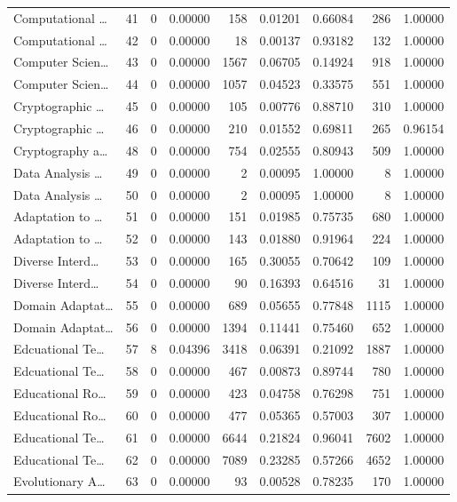 \begin{table}
\begin{tabular}{lrrrrrrrr}
Computational … & 41 & 0 & 0.00000 & 158 & 0.01201 & 0.66084 & 286 & 1.00000 \\
Computational … & 42 & 0 & 0.00000 & 18 & 0.00137 & 0.93182 & 132 & 1.00000 \\
Computer Scien… & 43 & 0 & 0.00000 & 1567 & 0.06705 & 0.14924 & 918 & 1.00000 \\
Computer Scien… & 44 & 0 & 0.00000 & 1057 & 0.04523 & 0.33575 & 551 & 1.00000 \\
Cryptographic … & 45 & 0 & 0.00000 & 105 & 0.00776 & 0.88710 & 310 & 1.00000 \\
Cryptographic … & 46 & 0 & 0.00000 & 210 & 0.01552 & 0.69811 & 265 & 0.96154 \\
Cryptography a… & 48 & 0 & 0.00000 & 754 & 0.02555 & 0.80943 & 509 & 1.00000 \\
Data Analysis … & 49 & 0 & 0.00000 & 2 & 0.00095 & 1.00000 & 8 & 1.00000 \\
Data Analysis … & 50 & 0 & 0.00000 & 2 & 0.00095 & 1.00000 & 8 & 1.00000 \\
Adaptation to … & 51 & 0 & 0.00000 & 151 & 0.01985 & 0.75735 & 680 & 1.00000 \\
Adaptation to … & 52 & 0 & 0.00000 & 143 & 0.01880 & 0.91964 & 224 & 1.00000 \\
Diverse Interd… & 53 & 0 & 0.00000 & 165 & 0.30055 & 0.70642 & 109 & 1.00000 \\
Diverse Interd… & 54 & 0 & 0.00000 & 90 & 0.16393 & 0.64516 & 31 & 1.00000 \\
Domain Adaptat… & 55 & 0 & 0.00000 & 689 & 0.05655 & 0.77848 & 1115 & 1.00000 \\
Domain Adaptat… & 56 & 0 & 0.00000 & 1394 & 0.11441 & 0.75460 & 652 & 1.00000 \\
Edcuational Te… & 57 & 8 & 0.04396 & 3418 & 0.06391 & 0.21092 & 1887 & 1.00000 \\
Edcuational Te… & 58 & 0 & 0.00000 & 467 & 0.00873 & 0.89744 & 780 & 1.00000 \\
Educational Ro… & 59 & 0 & 0.00000 & 423 & 0.04758 & 0.76298 & 751 & 1.00000 \\
Educational Ro… & 60 & 0 & 0.00000 & 477 & 0.05365 & 0.57003 & 307 & 1.00000 \\
Educational Te… & 61 & 0 & 0.00000 & 6644 & 0.21824 & 0.96041 & 7602 & 1.00000 \\
Educational Te… & 62 & 0 & 0.00000 & 7089 & 0.23285 & 0.57266 & 4652 & 1.00000 \\
Evolutionary A… & 63 & 0 & 0.00000 & 93 & 0.00528 & 0.78235 & 170 & 1.00000 \\

\end{tabular}
\end{table}
